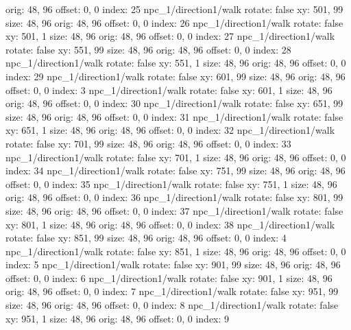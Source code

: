   orig: 48, 96
  offset: 0, 0
  index: 25
npc_1/direction1/walk
  rotate: false
  xy: 501, 99
  size: 48, 96
  orig: 48, 96
  offset: 0, 0
  index: 26
npc_1/direction1/walk
  rotate: false
  xy: 501, 1
  size: 48, 96
  orig: 48, 96
  offset: 0, 0
  index: 27
npc_1/direction1/walk
  rotate: false
  xy: 551, 99
  size: 48, 96
  orig: 48, 96
  offset: 0, 0
  index: 28
npc_1/direction1/walk
  rotate: false
  xy: 551, 1
  size: 48, 96
  orig: 48, 96
  offset: 0, 0
  index: 29
npc_1/direction1/walk
  rotate: false
  xy: 601, 99
  size: 48, 96
  orig: 48, 96
  offset: 0, 0
  index: 3
npc_1/direction1/walk
  rotate: false
  xy: 601, 1
  size: 48, 96
  orig: 48, 96
  offset: 0, 0
  index: 30
npc_1/direction1/walk
  rotate: false
  xy: 651, 99
  size: 48, 96
  orig: 48, 96
  offset: 0, 0
  index: 31
npc_1/direction1/walk
  rotate: false
  xy: 651, 1
  size: 48, 96
  orig: 48, 96
  offset: 0, 0
  index: 32
npc_1/direction1/walk
  rotate: false
  xy: 701, 99
  size: 48, 96
  orig: 48, 96
  offset: 0, 0
  index: 33
npc_1/direction1/walk
  rotate: false
  xy: 701, 1
  size: 48, 96
  orig: 48, 96
  offset: 0, 0
  index: 34
npc_1/direction1/walk
  rotate: false
  xy: 751, 99
  size: 48, 96
  orig: 48, 96
  offset: 0, 0
  index: 35
npc_1/direction1/walk
  rotate: false
  xy: 751, 1
  size: 48, 96
  orig: 48, 96
  offset: 0, 0
  index: 36
npc_1/direction1/walk
  rotate: false
  xy: 801, 99
  size: 48, 96
  orig: 48, 96
  offset: 0, 0
  index: 37
npc_1/direction1/walk
  rotate: false
  xy: 801, 1
  size: 48, 96
  orig: 48, 96
  offset: 0, 0
  index: 38
npc_1/direction1/walk
  rotate: false
  xy: 851, 99
  size: 48, 96
  orig: 48, 96
  offset: 0, 0
  index: 4
npc_1/direction1/walk
  rotate: false
  xy: 851, 1
  size: 48, 96
  orig: 48, 96
  offset: 0, 0
  index: 5
npc_1/direction1/walk
  rotate: false
  xy: 901, 99
  size: 48, 96
  orig: 48, 96
  offset: 0, 0
  index: 6
npc_1/direction1/walk
  rotate: false
  xy: 901, 1
  size: 48, 96
  orig: 48, 96
  offset: 0, 0
  index: 7
npc_1/direction1/walk
  rotate: false
  xy: 951, 99
  size: 48, 96
  orig: 48, 96
  offset: 0, 0
  index: 8
npc_1/direction1/walk
  rotate: false
  xy: 951, 1
  size: 48, 96
  orig: 48, 96
  offset: 0, 0
  index: 9

